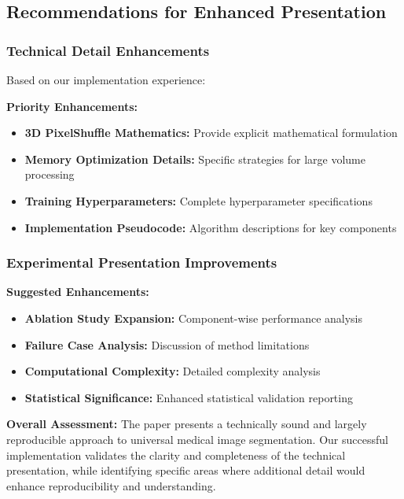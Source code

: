 \subsection*{Recommendations for Enhanced Presentation}

\subsubsection*{Technical Detail Enhancements}
Based on our implementation experience:

\textbf{Priority Enhancements:}
\begin{itemize}
    \item \textbf{3D PixelShuffle Mathematics:} Provide explicit mathematical formulation
    \item \textbf{Memory Optimization Details:} Specific strategies for large volume processing
    \item \textbf{Training Hyperparameters:} Complete hyperparameter specifications
    \item \textbf{Implementation Pseudocode:} Algorithm descriptions for key components
\end{itemize}

\subsubsection*{Experimental Presentation Improvements}
\textbf{Suggested Enhancements:}
\begin{itemize}
    \item \textbf{Ablation Study Expansion:} Component-wise performance analysis
    \item \textbf{Failure Case Analysis:} Discussion of method limitations
    \item \textbf{Computational Complexity:} Detailed complexity analysis
    \item \textbf{Statistical Significance:} Enhanced statistical validation reporting
\end{itemize}

\textbf{Overall Assessment:} The paper presents a technically sound and largely reproducible approach to universal medical image segmentation. Our successful implementation validates the clarity and completeness of the technical presentation, while identifying specific areas where additional detail would enhance reproducibility and understanding.
